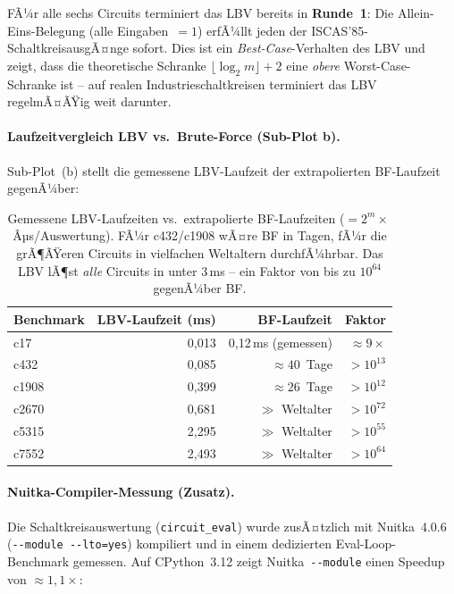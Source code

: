 ﻿\documentclass[a4paper,12pt]{article}
\theoremstyle{definition}
\begin{document}
FÃ¼r alle sechs Circuits terminiert das LBV bereits in \textbf{Runde~1}:
Die Allein-Eins-Belegung (alle Eingaben~$= 1$) erfÃ¼llt jeden der
ISCAS'85-SchaltkreisausgÃ¤nge sofort.  Dies ist ein \emph{Best-Case}-Verhalten
des LBV und zeigt, dass die theoretische Schranke
$\lfloor\log_2 m\rfloor + 2$ eine \emph{obere} Worst-Case-Schranke ist --
auf realen Industrieschaltkreisen terminiert das LBV regelmÃ¤ÃŸig weit darunter.

\paragraph{Laufzeitvergleich LBV vs.\ Brute-Force (Sub-Plot b).}
Sub-Plot~(b) stellt die gemessene LBV-Laufzeit der extrapolierten
BF-Laufzeit gegenÃ¼ber:

\begin{table}[h]
  \centering
  \begin{tabular}{lrrr}
    \toprule
    \textbf{Benchmark} & \textbf{LBV-Laufzeit (ms)} & \textbf{BF-Laufzeit}
      & \textbf{Faktor} \\
    \midrule
    c17   &              0{,}013 &        0{,}12\,ms (gemessen) & ${\approx}9\times$ \\
    c432  &              0{,}085 &        ${\approx}40$~Tage    & $>10^{13}$ \\
    c1908 &              0{,}399 &        ${\approx}26$~Tage    & $>10^{12}$ \\
    c2670 &              0{,}681 & $\gg$ Weltalter              & $>10^{72}$ \\
    c5315 &              2{,}295 & $\gg$ Weltalter              & $>10^{55}$ \\
    c7552 &              2{,}493 & $\gg$ Weltalter              & $>10^{64}$ \\
    \bottomrule
  \end{tabular}
  \caption{Gemessene LBV-Laufzeiten vs.\ extrapolierte BF-Laufzeiten
           ($= 2^m \times$\,Âµs/Auswertung).  FÃ¼r c432/c1908 wÃ¤re BF in
           Tagen, fÃ¼r die grÃ¶ÃŸeren Circuits in vielfachen Weltaltern
           durchfÃ¼hrbar.  Das LBV lÃ¶st \emph{alle} Circuits in unter
           $3$\,ms -- ein Faktor von bis zu $10^{64}$ gegenÃ¼ber BF.}
  \label{tab:lbv-bf-zeiten}
\end{table}

\paragraph{Nuitka-Compiler-Messung (Zusatz).}
Die Schaltkreisauswertung (\texttt{circuit\_eval}) wurde zusÃ¤tzlich mit
Nuitka~4.0.6 (\texttt{-{}-module -{}-lto=yes}) kompiliert und in einem
dedizierten Eval-Loop-Benchmark gemessen.  Auf CPython~3.12 zeigt
Nuitka~\texttt{-{}-module} einen Speedup von ${\approx}1{,}1\times$:
\end{document}
